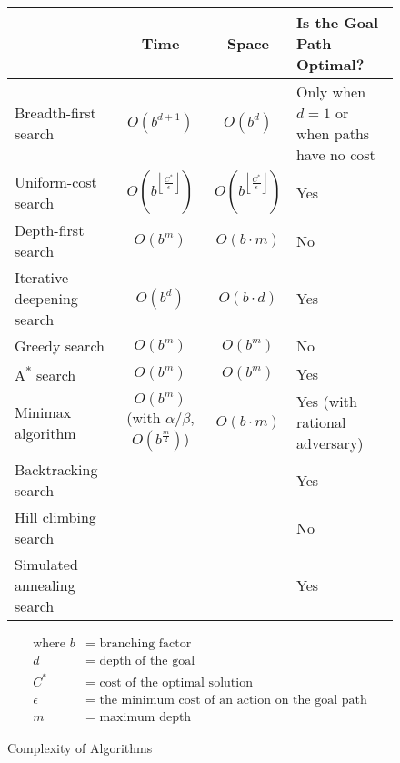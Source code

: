 \begin{figure}[!htb]
	\caption{Complexity of Algorithms}
	\label{fig:algos-complexity}
	\center
	\begin{tabular}{ l | c c p{4cm} }
		& Time & Space & Is the Goal Path Optimal? \\
		\hline
		Breadth-first search & $O(b^{d+1})$ & $O(b^d)$ & Only when $d = 1$ or when paths have no cost \\
		Uniform-cost search & $O(b^{\left\lfloor \frac{C^*}{\epsilon} \right\rfloor})$ & $O(b^{\left\lfloor \frac{C^*}{\epsilon} \right\rfloor})$ & Yes \\
		Depth-first search & $O(b^m)$ & $O(b \cdot m)$ & No \\
		Iterative deepening search & $O(b^d)$ & $O(b \cdot d)$ & Yes \\
		\hline
		Greedy search & $O(b^m)$ & $O(b^m)$ & No \\
		A\textsuperscript{*} search & $O(b^m)$ & $O(b^m)$ & Yes \\
		\hline
		Minimax algorithm & $O(b^m)$ (with $\alpha / \beta$, $O(b^\frac{m}{2})$) & $O(b \cdot m)$ & Yes (with rational adversary) \\
		Backtracking search & & & Yes \\
		Hill climbing search & & & No \\
		Simulated annealing search & & & Yes
	\end{tabular}

	\begin{align*}
		\textrm{where }
		b &= \textrm{ branching factor} \\
		d &= \textrm{ depth of the goal} \\
		C^* &= \textrm{ cost of the optimal solution} \\
		\epsilon &= \textrm{ the minimum cost of an action on the goal path} \\
		m &= \textrm{ maximum depth}
	\end{align*}
\end{figure}

\clearpage
